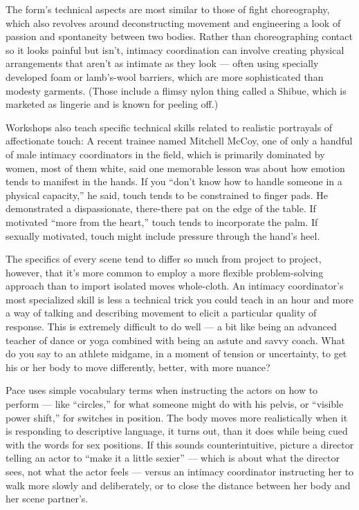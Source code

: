 The form's technical aspects are most similar to those of fight
choreography, which also revolves around deconstructing movement and
engineering a look of passion and spontaneity between two bodies. Rather
than choreographing contact so it looks painful but isn't, inti­macy
coordination can involve creating physical arrangements that aren't as
intimate as they look --- often using specially developed foam or
lamb's-wool barriers, which are more sophisticated than modesty
garments. (Those include a flimsy nylon thing called a Shibue, which is
marketed as lingerie and is known for peeling off.)

Workshops also teach specific technical skills related to realistic
portrayals of affectionate touch: A recent trainee named Mitchell McCoy,
one of only a handful of male intimacy coordinators in the field, which
is primarily dominated by women, most of them white, said one memorable
lesson was about how emotion tends to manifest in the hands. If you
``don't know how to handle someone in a physical capacity,'' he said,
touch tends to be constrained to finger pads. He demonstrated a
dispassionate, there-there pat on the edge of the table. If motivated
``more from the heart,'' touch tends to incorporate the palm. If
sexually motivated, touch might include pressure through the hand's
heel.

The specifics of every scene tend to differ so much from project to
project, however, that it's more common to employ a more flexible
problem-solving approach than to import isolated moves whole-cloth. An
intimacy coordinator's most specialized skill is less a technical trick
you could teach in an hour and more a way of talking and describing
movement to elicit a particular quality of response. This is extremely
difficult to do well --- a bit like being an advanced teacher of dance
or yoga combined with being an astute and savvy coach. What do you say
to an athlete midgame, in a moment of tension or uncertainty, to get his
or her body to move differently, better, with more nuance?

Pace uses simple vocabulary terms when instructing the actors on how to
perform --- like ``circles,'' for what someone might do with his pelvis,
or ``visible power shift,'' for switches in position. The body moves
more realistically when it is responding to descriptive language, it
turns out, than it does while being cued with the words for sex
positions. If this sounds counterintuitive, picture a director telling
an actor to ``make it a little sexier'' --- which is about what the
director sees, not what the actor feels --- versus an intimacy
coordinator instructing her to walk more slowly and deliberately, or to
close the distance between her body and her scene partner's.

